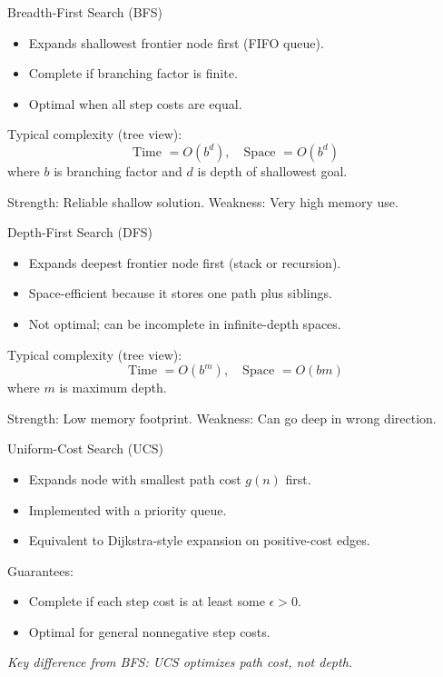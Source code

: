 \documentclass[10pt]{beamer}
\begin{document}
\begin{frame}{Breadth-First Search (BFS)}
    \begin{itemize}
        \item Expands shallowest frontier node first (FIFO queue).
        \item Complete if branching factor is finite.
        \item Optimal when all step costs are equal.
    \end{itemize}
    \vspace{0.2cm}
    Typical complexity (tree view):
    \[
        \text{Time } = O(b^d), \quad \text{Space } = O(b^d)
    \]
    where $b$ is branching factor and $d$ is depth of shallowest goal.

    \vspace{0.2cm}
    \alert{Strength:} Reliable shallow solution.
    \hfill
    \alert{Weakness:} Very high memory use.
\end{frame}

\begin{frame}{Depth-First Search (DFS)}
    \begin{itemize}
        \item Expands deepest frontier node first (stack or recursion).
        \item Space-efficient because it stores one path plus siblings.
        \item Not optimal; can be incomplete in infinite-depth spaces.
    \end{itemize}
    \vspace{0.2cm}
    Typical complexity (tree view):
    \[
        \text{Time } = O(b^m), \quad \text{Space } = O(bm)
    \]
    where $m$ is maximum depth.

    \vspace{0.2cm}
    \alert{Strength:} Low memory footprint.
    \hfill
    \alert{Weakness:} Can go deep in wrong direction.
\end{frame}

\begin{frame}{Uniform-Cost Search (UCS)}
    \begin{itemize}
        \item Expands node with smallest path cost $g(n)$ first.
        \item Implemented with a priority queue.
        \item Equivalent to Dijkstra-style expansion on positive-cost edges.
    \end{itemize}
    \vspace{0.2cm}
    Guarantees:
    \begin{itemize}
        \item Complete if each step cost is at least some $\epsilon > 0$.
        \item Optimal for general nonnegative step costs.
    \end{itemize}
    \vspace{0.2cm}
    \textit{Key difference from BFS: UCS optimizes path cost, not depth.}
\end{frame}
\end{document}
